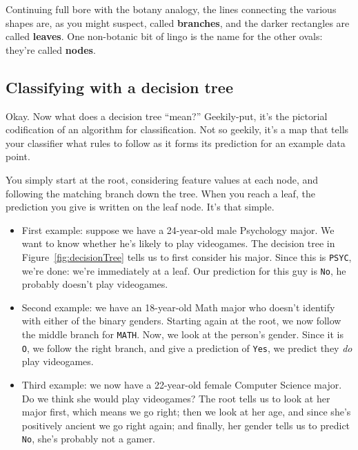 
Continuing full bore with the botany analogy, the lines connecting the various
shapes are, as you might suspect, called \textbf{branches}, and the darker
rectangles are called \textbf{leaves}. One non-botanic bit of lingo is the name
for the other ovals: they're called \textbf{nodes}.

\subsection{Classifying with a decision tree}

Okay. Now what does a decision tree ``mean?'' Geekily-put, it's the pictorial
codification of an algorithm for classification. Not so geekily, it's a map
that tells your classifier what rules to follow as it forms its prediction for
an example data point.

You simply start at the root, considering feature values at each node, and
following the matching branch down the tree. When you reach a leaf, the
prediction you give is written on the leaf node. It's that simple.

\begin{itemize}

\item[\leftpointright] First example: suppose we have a 24-year-old male
Psychology major. We want to know whether he's likely to play videogames. The
decision tree in Figure~\ref{fig:decisionTree} tells us to first consider his
\textsf{major}. Since this is \texttt{PSYC}, we're done: we're immediately at a
leaf. Our prediction for this guy is \texttt{No}, he probably doesn't play
videogames.

\item[\leftpointright] Second example: we have an 18-year-old Math major who
doesn't identify with either of the binary genders. Starting again at the root,
we now follow the middle branch for \texttt{MATH}. Now, we look at the person's
gender. Since it is \texttt{O}, we follow the right branch, and give a
prediction of \texttt{Yes}, we predict they \textit{do} play videogames.

\item[\leftpointright] Third example: we now have a 22-year-old female Computer
Science major. Do we think she would play videogames? The root tells us to look
at her \textsf{major} first, which means we go right; then we look at her
\textsf{age}, and since she's positively ancient we go right again; and
finally, her \textsf{gender} tells us to predict \texttt{No}, she's probably
not a gamer.

\end{itemize}

